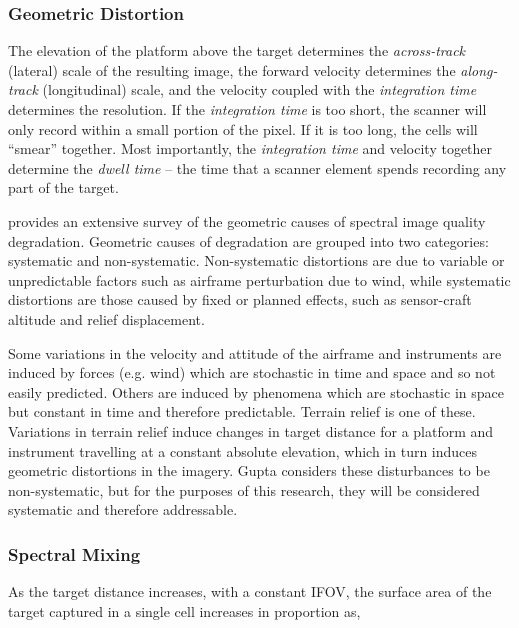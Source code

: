 
\subsubsection{Geometric Distortion}


The elevation of the platform above the target determines the \emph{across-track} (lateral) scale of the resulting image, the forward velocity determines the \emph{along-track} (longitudinal) scale, and the velocity coupled with the \emph{integration time} determines the resolution. If the \emph{integration time} is too short, the scanner will only record within a small portion of the pixel. If it is  too long, the cells will ``smear'' together. Most importantly, the \emph{integration time} and velocity together determine the \emph{dwell time} -- the time that a scanner element spends recording any part of the target. 


\cite{Gupta2018} provides an extensive survey of the geometric causes of spectral image quality degradation. Geometric causes of degradation are grouped into two categories: systematic and non-systematic. Non-systematic distortions are due to variable or unpredictable factors such as airframe perturbation due to wind, while systematic distortions are those caused by fixed or planned effects, such as sensor-craft altitude and relief displacement.

Some variations in the velocity and attitude of the airframe and instruments are induced by forces (e.g. wind) which are stochastic in time and space and so not easily predicted. Others are induced by phenomena which are stochastic in space but constant in time and therefore predictable. Terrain relief is one of these. Variations in terrain relief induce changes in target distance for a platform and instrument travelling at a constant absolute elevation, which in turn induces geometric distortions in the imagery. Gupta \cite{Gupta2018} considers these disturbances to be non-systematic, but for the purposes of this research, they will be considered systematic and therefore addressable.

\subsubsection*{Spectral Mixing}

As the target distance increases, with a constant IFOV, the surface area of the target captured in a single cell increases in proportion as, 


